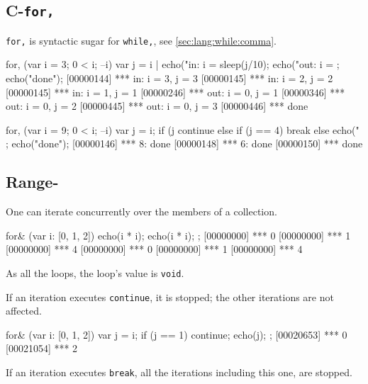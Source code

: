 \subsection{C-\lstinline{for,}}
\label{sec:lang:forc:comma}
\experimentalremoved{}

\lstinline|for,| is syntactic sugar for \lstinline|while,|, see
\autoref{sec:lang:while:comma}.

\begin{urbiscript}
for, (var i = 3; 0 < i; --i)
{
  var j = i |
  echo("in: i = %
  sleep(j/10);
  echo("out: i = %
};
echo("done");
[00000144] *** in: i = 3, j = 3
[00000145] *** in: i = 2, j = 2
[00000145] *** in: i = 1, j = 1
[00000246] *** out: i = 0, j = 1
[00000346] *** out: i = 0, j = 2
[00000445] *** out: i = 0, j = 3
[00000446] *** done
\end{urbiscript}

\begin{urbiscript}
for, (var i = 9; 0 < i; --i)
{
  var j = i;
  if (j %
    continue
  else if (j == 4)
    break
  else
    echo("%
};
echo("done");
[00000146] *** 8: done
[00000148] *** 6: done
[00000150] *** done
\end{urbiscript}


\subsection{Range-\forAnd}
\label{sec:lang:foreach:and}

One can iterate concurrently over the members of a collection.

\begin{urbiscript}
for& (var i: [0, 1, 2])
{
  echo(i * i);
  echo(i * i);
};
[00000000] *** 0
[00000000] *** 1
[00000000] *** 4
[00000000] *** 0
[00000000] *** 1
[00000000] *** 4
\end{urbiscript}

As all the loops, the loop's value is \lstinline|void|.

If an iteration executes \lstinline{continue}, it is stopped; the
other iterations are not affected.

\begin{urbiscript}
for& (var i: [0, 1, 2])
{
  var j = i;
  if (j == 1)
    continue;
  echo(j);
};
[00020653] *** 0
[00021054] *** 2
\end{urbiscript}

If an iteration executes \lstinline{break}, all the iterations
including this one, are stopped.


